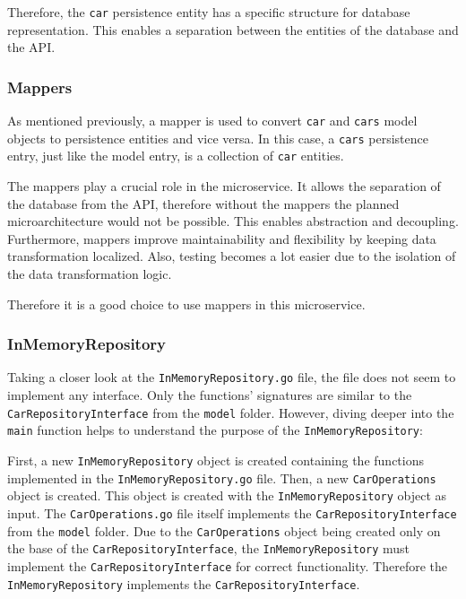 Therefore, the \texttt{car} persistence entity has a specific structure for database representation.
This enables a separation between the entities of the database and the API.

\subsubsection*{Mappers}
As mentioned previously, a mapper is used to convert \texttt{car} and \texttt{cars} model objects to persistence entities and vice versa.
In this case, a \texttt{cars} persistence entry, just like the model entry, is a collection of \texttt{car} entities.

The mappers play a crucial role in the microservice.
It allows the separation of the database from the API, therefore without the mappers the planned microarchitecture would not be possible.
This enables abstraction and decoupling.
Furthermore, mappers improve maintainability and flexibility by keeping data transformation localized.
Also, testing becomes a lot easier due to the isolation of the data transformation logic.

Therefore it is a good choice to use mappers in this microservice.

\subsubsection*{InMemoryRepository}
Taking a closer look at the \texttt{InMemoryRepository.go} file, the file does not seem to implement any interface.
Only the functions' signatures are similar to the \texttt{CarRepositoryInterface} from the \texttt{model} folder.
However, diving deeper into the \texttt{main} function helps to understand the purpose of the \texttt{InMemoryRepository}:

First, a new \texttt{InMemoryRepository} object is created containing the functions implemented in the \texttt{InMemoryRepository.go} file.
Then, a new \texttt{CarOperations} object is created.
This object is created with the \texttt{InMemoryRepository} object as input.
The \texttt{CarOperations.go} file itself implements the \texttt{CarRepositoryInterface} from the \texttt{model} folder.
Due to the \texttt{CarOperations} object being created only on the base of the \texttt{CarRepositoryInterface}, the \texttt{InMemoryRepository} must implement the \texttt{CarRepositoryInterface} for correct functionality.
Therefore the \texttt{InMemoryRepository} implements the \texttt{CarRepositoryInterface}.

